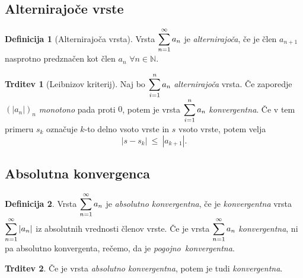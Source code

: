 \documentclass[11pt]{article}
\theoremstyle{definition}
\newtheorem{definicija}{Definicija}[section]
\theoremstyle{definition}
\newtheorem{trditev}{Trditev}[section]
\theoremstyle{definition}
\theoremstyle{theorem}
\begin{document}

\subsection{Alternirajoče vrste}
\vspace{0.5cm}

\begin{definicija}[Alternirajoča vrsta]

Vrsta $\mathlarger{\sum_{n=1}^{\infty} a_n}$ je \textit{alternirajoča}, če je člen $a_{n+1}$ nasprotno predznačen kot člen $a_n$ $\forall n \in \mathbb{N}$.

\end{definicija}
\vspace{0.5cm}

\begin{trditev}[Leibnizov kriterij]

Naj bo $\mathlarger{\sum_{i=1}^n a_n}$ \textit{alternirajoča} vrsta. Če \hbox{zaporedje} $(|a_n|)_n$ \textit{monotono} pada proti $0$, potem je vrsta $\mathlarger{\sum_{i=1}^n a_n}$ \hbox{\textit{konvergentna}}. Če v tem primeru $s_k$ označuje $k$-to delno vsoto vrste in $s$ vsoto vrste, potem velja
$$|s - s_k| ~\leq~ |a_{k+1}|.$$

\end{trditev}
\vspace{0.5cm}


\subsection{Absolutna konvergenca}

\begin{definicija}

Vrsta $\mathlarger{\sum_{n=1}^{\infty} a_n}$ je \textit{absolutno konvergentna}, če je \mbox{\textit{konvergentna}} vrsta $\mathlarger{\sum_{n=1}^{\infty} |a_n|}$ iz absolutnih vrednosti členov vrste. Če je vrsta $\mathlarger{\sum_{n=1}^{\infty} a_n}$ \mbox{\textit{konvergentna}}, ni pa absolutno konvergenta, rečemo, da je \mbox{\textit{pogojno konvergentna}}.

\end{definicija}
\vspace{0.5cm}

\begin{trditev}

Če je vrsta \textit{absolutno konvergentna}, potem je tudi \mbox{\textit{konvergentna}}.

\end{trditev}
\vspace{0.5cm}
\end{document}
